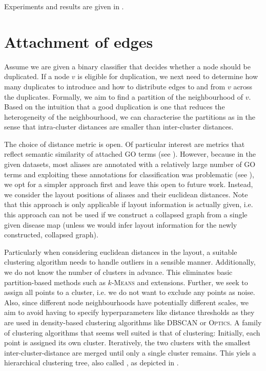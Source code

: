 \documentclass[
	fontsize=10pt, %
	twoside=false, %
	secnumdepth=1, %
  toc=indentunnumbered %
]{kaobook}
\begin{document}
Experiments and results are given in .


\section{Attachment of edges}
\label{sec:edge attachment}


Assume we are given a binary classifier that decides whether a node should be
duplicated. If a node $v$ is eligible for duplication, we next need to determine
how many duplicates to introduce and how to distribute edges to and from $v$
across the duplicates. Formally, we aim to find a partition of the neighbourhood
of $v$. Based on the intuition that a good duplication is one that reduces the
heterogeneity of the neighbourhood, we can characterise the partitions as
 in the sense that intra-cluster distances are smaller than
inter-cluster distances.

The choice of distance metric is open. Of particular interest are metrics that
reflect semantic similarity of attached GO terms
(see ).
However, because in the given
datasets, most aliases are annotated with a relatively large number of GO terms
and exploiting these annotations for classification was problematic (see ),
we opt for a
simpler approach first and leave this open to future work. %
Instead, we consider the layout positions of aliases and their euclidean
distances. Note that this approach is only applicable if layout information is
actually given, i.e. this approach can not be used if we construct a collapsed
graph from a single given disease map (unless we would infer layout information
for the newly constructed, collapsed graph).

Particularly when considering euclidean distances in the layout, a suitable
clustering algorithm needs to handle outliers in a sensible manner.
Additionally, we do not know the number of clusters in advance. This eliminates
basic partition-based methods such as $k$-\textsc{Means} and extensions.
%
Further, we seek to assign all points to a cluster, i.e. we do not want to
exclude any points as noise. Also, since different node neighbourhoods have
potentially different scales, we aim to avoid having to specify hyperparameters
like distance thresholds as they are used in density-based clustering algorithms
like \textsc{DBSCAN} or \textsc{Optics}.
%
A family of clustering algorithms that seems well suited is that of
 clustering: Initially, each point is assigned its own
cluster. Iteratively, the two clusters with the smallest inter-cluster-distance
are merged until only a single cluster remains. This yiels a hierarchical
clustering tree, also called , as depicted in
.
\end{document}
